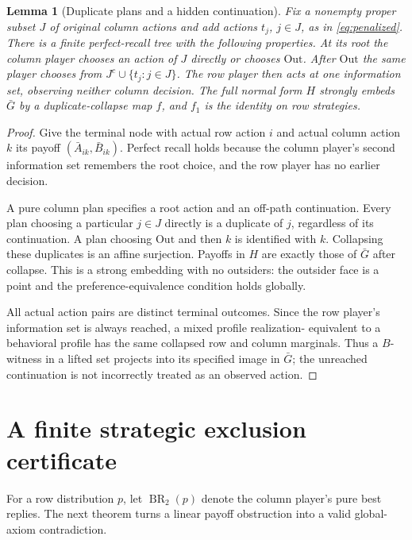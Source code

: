 \documentclass[11pt]{article}
\newcommand{\BR}{\operatorname{BR}}
\newtheorem{lemma}[theorem]{Lemma}
\theoremstyle{definition}
\theoremstyle{remark}
\begin{document}
\begin{lemma}[Duplicate plans and a hidden continuation]\label{lem:plans}
Fix a nonempty proper subset $J$ of original column actions and add actions
$t_j$, $j\in J$, as in \eqref{eq:penalized}. There is a finite perfect-recall
tree with the following properties. At its root the column player chooses
an action of $J$ directly or chooses $\mathrm{Out}$. After $\mathrm{Out}$
the same player chooses from $J^c\cup\{t_j:j\in J\}$. The row player
then acts at one information set, observing neither column decision.
The full normal form $H$ strongly embeds $\bar G$ by a duplicate-collapse
map $f$, and $f_1$ is the identity on row strategies.
\end{lemma}
\begin{proof}
Give the terminal node with actual row action $i$ and actual column action
$k$ its payoff $(\bar A_{ik},\bar B_{ik})$. Perfect recall holds because
the column player's second information set remembers the root choice,
and the row player has no earlier decision.

A pure column plan specifies a root action and an off-path continuation.
Every plan choosing a particular $j\in J$ directly is a duplicate of
$j$, regardless of its continuation. A plan choosing $\mathrm{Out}$
and then $k$ is identified with $k$. Collapsing these duplicates is an
affine surjection. Payoffs in $H$ are exactly those of $\bar G$ after
collapse. This is a strong embedding with no outsiders: the outsider face
is a point and the preference-equivalence condition holds globally.

All actual action pairs are distinct terminal outcomes. Since the row
player's information set is always reached, a mixed profile realization-
equivalent to a behavioral profile has the same collapsed row and column
marginals. Thus a $B$-witness in a lifted set projects into its specified
image in $\bar G$; the unreached continuation is not incorrectly treated
as an observed action.
\end{proof}


\section{A finite strategic exclusion certificate}
For a row distribution $p$, let $\BR_2(p)$ denote the column player's
pure best replies. The next theorem turns a linear payoff obstruction
into a valid global-axiom contradiction.
\end{document}
